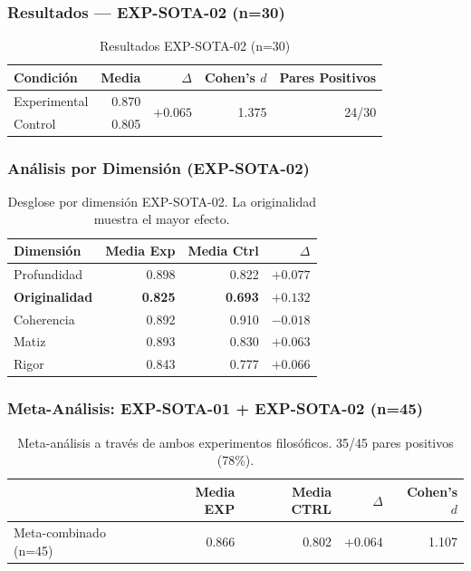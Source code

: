 \documentclass[12pt, a4paper]{article}
\begin{document}
\subsubsection{Resultados — EXP-SOTA-02 (n=30)}
\begin{table}[h]
\centering
\begin{tabular}{lrrrr}
\toprule
Condición & Media & $\Delta$ & Cohen's $d$ & Pares Positivos \\
\midrule
Experimental & 0.870 & \multirow{2}{*}{$+0.065$} & \multirow{2}{*}{1.375} & \multirow{2}{*}{24/30} \\
Control & 0.805 & & & \\
\bottomrule
\end{tabular}
\caption{Resultados EXP-SOTA-02 (n=30)}
\end{table}

\subsubsection{Análisis por Dimensión (EXP-SOTA-02)}
\begin{table}[h]
\centering
\begin{tabular}{lrrr}
\toprule
Dimensión & Media Exp & Media Ctrl & $\Delta$ \\
\midrule
Profundidad & 0.898 & 0.822 & $+0.077$ \\
\textbf{Originalidad} & \textbf{0.825} & \textbf{0.693} & $\mathbf{+0.132}$ \\
Coherencia & 0.892 & 0.910 & $-0.018$ \\
Matiz & 0.893 & 0.830 & $+0.063$ \\
Rigor & 0.843 & 0.777 & $+0.066$ \\
\bottomrule
\end{tabular}
\caption{Desglose por dimensión EXP-SOTA-02. La originalidad muestra el mayor efecto.}
\end{table}

\subsubsection{Meta-Análisis: EXP-SOTA-01 + EXP-SOTA-02 (n=45)}
\begin{table}[h]
\centering
\begin{tabular}{lrrrr}
\toprule
 & Media EXP & Media CTRL & $\Delta$ & Cohen's $d$ \\
\midrule
Meta-combinado (n=45) & 0.866 & 0.802 & $+0.064$ & 1.107 \\
\bottomrule
\end{tabular}
\caption{Meta-análisis a través de ambos experimentos filosóficos. 35/45 pares positivos (78\%).}
\end{table}
\end{document}
